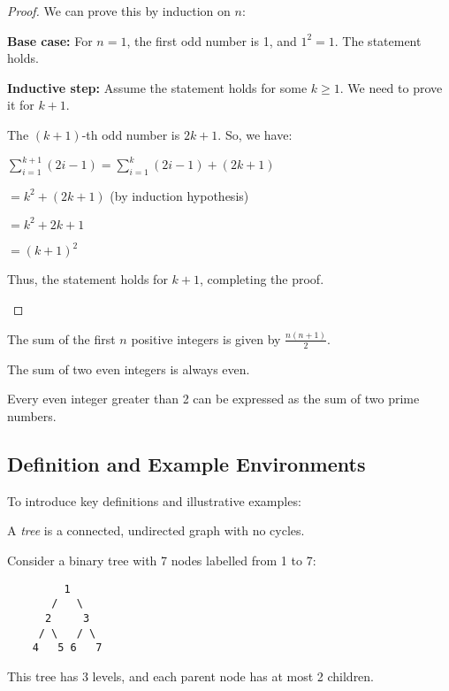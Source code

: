\documentclass{ltxdoc}
\begin{document}
\begin{proof}
	We can prove this by induction on $n$:
	
	\begin{case}
		\item \textbf{Base case:} For $n=1$, the first odd number is 1, and $1^2 = 1$. The statement holds.
		    
		\item \textbf{Inductive step:} Assume the statement holds for some $k \geq 1$. We need to prove it for $k+1$.
		    
		The $(k+1)$-th odd number is $2k+1$. So, we have:
		    
		$\sum_{i=1}^{k+1} (2i-1) = \sum_{i=1}^k (2i-1) + (2k+1)$
		    
		$= k^2 + (2k+1)$ (by induction hypothesis)
		    
		$= k^2 + 2k + 1$
		    
		$= (k+1)^2$
		    
		Thus, the statement holds for $k+1$, completing the proof.    
	\end{case}
\end{proof}

\begin{corollary}
	The sum of the first $n$ positive integers is given by $\frac{n(n+1)}{2}$.
\end{corollary}

\begin{proposition}
	The sum of two even integers is always even.
\end{proposition}

\begin{conjecture}
	Every even integer greater than 2 can be expressed as the sum of two prime numbers.
\end{conjecture}

\subsection{Definition and Example Environments}

To introduce key definitions and illustrative examples:

\begin{definition}[Tree]
	A \emph{tree} is a connected, undirected graph with no cycles.
\end{definition}

\begin{example}
	Consider a binary tree with 7 nodes labelled from 1 to 7:
	\begin{verbatim}
         1
       /   \
      2     3
     / \   / \
    4   5 6   7
	\end{verbatim}    
	This tree has 3 levels, and each parent node has at most 2 children.
\end{example}
\end{document}
